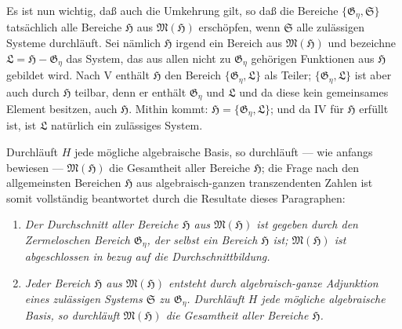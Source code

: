 Es ist nun wichtig, daß auch die Umkehrung gilt, so daß die Bereiche
$\{\mathfrak G_\eta,\mathfrak S\}$ tatsächlich alle Bereiche $\mathfrak H$ aus
$\mathfrak M(\mathfrak H)$ erschöpfen, wenn $\mathfrak S$ alle zulässigen Systeme
durchläuft. Sei nämlich $\mathfrak H$ irgend ein Bereich aus $\mathfrak M(\mathfrak H)$
und bezeichne $\mathfrak L=\mathfrak H-\mathfrak G_\eta$ das System, das aus
allen nicht zu $\mathfrak G_\eta$ gehörigen Funktionen aus $\mathfrak H$ gebildet
wird. Nach V enthält $\mathfrak H$ den Bereich $\{\mathfrak G_\eta,\mathfrak L\}$
als Teiler; $\{\mathfrak G_\eta,\mathfrak L\}$ ist aber auch durch $\mathfrak H$
teilbar, denn er enthält $\mathfrak G_\eta$ und $\mathfrak L$ und da diese kein
gemeinsames Element besitzen, auch $\mathfrak H$. Mithin kommt:
$\mathfrak H=\{\mathfrak G_\eta,\mathfrak L\}$; und da IV für $\mathfrak H$
erfüllt ist, ist $\mathfrak L$ natürlich ein zulässiges System.

Durchläuft $H$ jede mögliche algebraische Basis, so durchläuft --- wie anfangs
bewiesen --- $\mathfrak M(\mathfrak H)$ die Gesamtheit aller Bereiche $\mathfrak H$; die
Frage nach den allgemeinsten Bereichen $\mathfrak H$ aus algebraisch-ganzen
transzendenten Zahlen ist somit vollständig beantwortet durch die Resultate dieses
Paragraphen:
\begin{enumerate}
\item[a)] \emph{Der Durchschnitt aller Bereiche $\mathfrak H$ aus
$\mathfrak M(\mathfrak H)$ ist gegeben durch den Zermeloschen Bereich $\mathfrak G_\eta$,
der selbst ein Bereich $\mathfrak H$ ist; $\mathfrak M(\mathfrak H)$ ist abgeschlossen in
bezug auf die Durchschnittbildung.}
\item[b)] \emph{Jeder Bereich $\mathfrak H$ aus $\mathfrak M(\mathfrak H)$ entsteht durch
algebraisch-ganze Adjunktion eines zulässigen Systems $\mathfrak S$ zu
$\mathfrak G_\eta$. Durchläuft $H$ jede mögliche algebraische Basis, so
durchläuft $\mathfrak M(\mathfrak H)$ die Gesamtheit aller Bereiche $\mathfrak H$.}
\end{enumerate}




